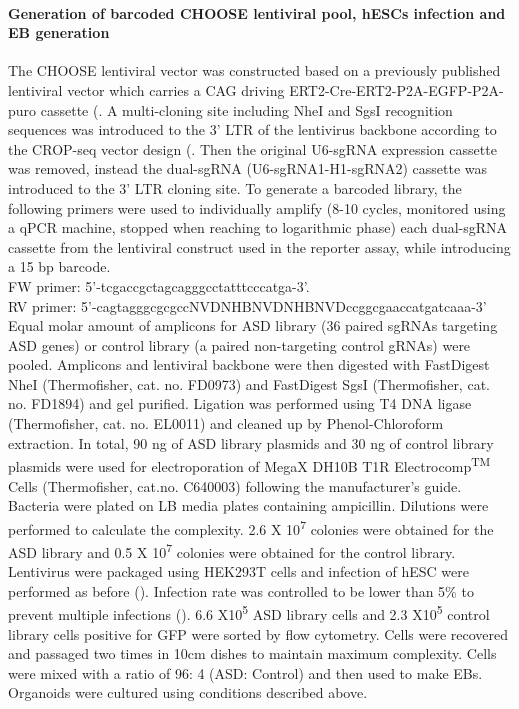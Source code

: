 \paragraph{Generation of barcoded CHOOSE lentiviral pool, hESCs infection and EB generation}
The CHOOSE lentiviral vector was constructed based on a previously published lentiviral vector which carries a CAG driving ERT2-Cre-ERT2-P2A-EGFP-P2A-puro cassette (\cite{esk_human_2020}. A multi-cloning site including NheI and SgsI recognition sequences was introduced to the 3' LTR of the lentivirus backbone according to the CROP-seq vector design (\cite{datlinger_pooled_2017}. Then the original U6-sgRNA expression cassette was removed, instead the dual-sgRNA (U6-sgRNA1-H1-sgRNA2) cassette was introduced to the 3' LTR cloning site. To generate a barcoded library, the following primers were used to individually amplify (8-10 cycles, monitored using a qPCR machine, stopped when reaching to logarithmic phase) each dual-sgRNA cassette from the lentiviral construct used in the reporter assay,  while introducing a 15 bp barcode. \\
FW primer: 5'-tcgaccgctagcagggcctatttcccatga-3'. \\
RV primer: 5'-cagtagggcgcgccNVDNHBNVDNHBNVDccggcgaaccatgatcaaa-3' \\
Equal molar amount of amplicons for ASD library (36 paired sgRNAs targeting ASD genes) or control library (a paired non-targeting control gRNAs) were pooled. Amplicons and lentiviral backbone were then digested with FastDigest NheI (Thermofisher, cat. no. FD0973) and FastDigest SgsI (Thermofisher, cat. no. FD1894) and gel purified. Ligation was performed using T4 DNA ligase (Thermofisher, cat. no. EL0011) and cleaned up by Phenol-Chloroform extraction. In total, 90 ng of ASD library plasmids and 30 ng of control library plasmids were used for electroporation of MegaX DH10B T1R Electrocomp\textsuperscript{TM} Cells (Thermofisher, cat.no. C640003) following the manufacturer's guide. Bacteria were plated on LB media plates containing ampicillin. Dilutions were performed to calculate the complexity. 2.6 X 10\textsuperscript{7} colonies were obtained for the ASD library and 0.5 X 10\textsuperscript{7} colonies were obtained for the control library. Lentivirus were packaged using HEK293T cells and infection of hESC were performed as before (\cite{esk_human_2020}). Infection rate was controlled to be lower than 5\% to prevent multiple infections (\cite{doench_am_2018}). 6.6 X10\textsuperscript{5} ASD library cells and 2.3 X10\textsuperscript{5} control library cells positive for GFP were sorted by flow cytometry. Cells were recovered and passaged two times in 10cm dishes to maintain maximum complexity. Cells were mixed with a ratio of 96: 4 (ASD: Control) and then used to make EBs. Organoids were cultured using conditions described above. 

